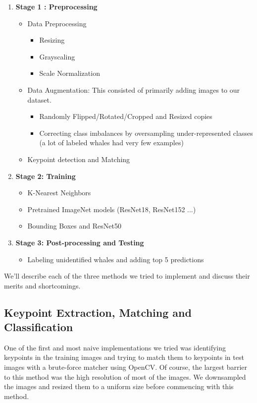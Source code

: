 \begin{enumerate}
	\item \textbf{Stage 1 : Preprocessing}
	\begin{itemize}
		\item Data Preprocessing
		\begin{itemize}
			\item Resizing
			\item Grayscaling
			\item Scale Normalization
		\end{itemize}
		\item Data Augmentation: This consisted of primarily adding images to our dataset.
		\begin{itemize}
			\item Randomly Flipped/Rotated/Cropped and Resized copies
			\item Correcting class imbalances by oversampling under-represented classes (a lot of labeled whales had very few examples)
		\end{itemize}
		\item Keypoint detection and Matching
	\end{itemize}
	\item \textbf{Stage 2: Training}
	\begin{itemize}
		\item K-Nearest Neighbors
		\item Pretrained ImageNet models (ResNet18, ResNet152 ...)
		\item Bounding Boxes and ResNet50
	\end{itemize}
	\item \textbf{Stage 3: Post-processing and Testing}
	\begin{itemize}
		\item Labeling unidentified whales and adding top 5 predictions
	\end{itemize}
\end{enumerate}

We'll describe each of the three methods we tried to implement and discuss their merits and shortcomings.

\subsection{Keypoint Extraction, Matching and Classification}

One of the first and most naive implementations we tried was identifying keypoints in the training images and trying to match them to keypoints in test images with a brute-force matcher using OpenCV. Of course, the largest barrier to this method was the high resolution of most of the images. We downsampled the images and resized them to a uniform size before commencing with this method. 

